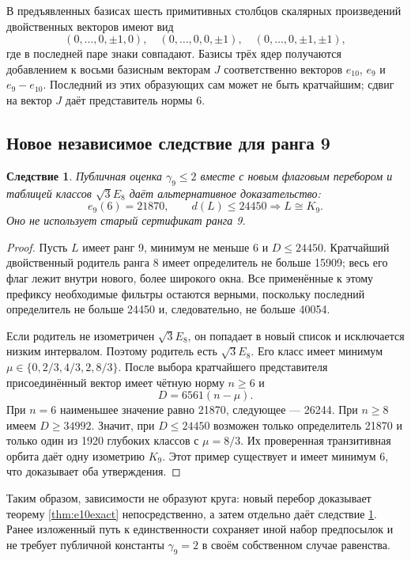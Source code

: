 \documentclass[11pt,a4paper]{article}
\newtheorem{corollary}[theorem]{Следствие}
\theoremstyle{remark}\newtheorem{remark}[theorem]{Замечание}
\begin{document}
В предъявленных базисах шесть примитивных столбцов скалярных произведений
двойственных векторов имеют вид
\[
 (0,\ldots,0,\pm1,0),\quad
 (0,\ldots,0,0,\pm1),\quad
 (0,\ldots,0,\pm1,\pm1),
\]
где в последней паре знаки совпадают. Базисы трёх ядер получаются
добавлением к восьми базисным векторам $J$ соответственно векторов
$e_{10}$, $e_9$ и $e_9-e_{10}$. Последний из этих образующих сам
может не быть кратчайшим; сдвиг на вектор $J$ даёт представитель нормы $6$.


\subsection{Новое независимое следствие для ранга 9}

\begin{corollary}\label{cor:newrank9}
Публичная оценка $\gamma_9\le2$ вместе с новым флаговым перебором и таблицей классов $\sqrt3E_8$ даёт альтернативное доказательство:
\[
e_9(6)=21870,\qquad d(L)\le24450\Longrightarrow L\cong K_9.
\]
Оно не использует старый сертификат ранга 9.
\end{corollary}

\begin{proof}
Пусть $L$ имеет ранг 9, минимум не меньше 6 и $D\le24450$. Кратчайший двойственный родитель ранга 8 имеет определитель не больше 15909; весь его флаг лежит внутри нового, более широкого окна. Все применённые к этому префиксу необходимые фильтры остаются верными, поскольку последний определитель не больше 24450 и, следовательно, не больше 40054.

Если родитель не изометричен $\sqrt3E_8$, он попадает в новый список и исключается низким интервалом. Поэтому родитель есть $\sqrt3E_8$. Его класс имеет минимум $\mu\in\{0,2/3,4/3,2,8/3\}$. После выбора кратчайшего представителя присоединённый вектор имеет чётную норму $n\ge6$ и
\[
D=6561(n-\mu).
\]
При $n=6$ наименьшее значение равно 21870, следующее --- 26244. При $n\ge8$ имеем $D\ge34992$. Значит, при $D\le24450$ возможен только определитель 21870 и только один из 1920 глубоких классов с $\mu=8/3$. Их проверенная транзитивная орбита даёт одну изометрию $K_9$. Этот пример существует и имеет минимум 6, что доказывает оба утверждения.
\end{proof}

Таким образом, зависимости не образуют круга: новый перебор доказывает теорему \ref{thm:e10exact} непосредственно, а затем отдельно даёт следствие \ref{cor:newrank9}. Ранее изложенный путь к единственности сохраняет иной набор предпосылок и не требует публичной константы $\gamma_9=2$ в своём собственном случае равенства.
\end{document}
